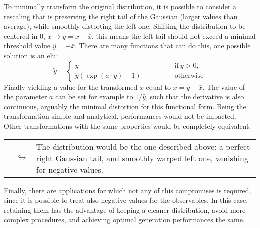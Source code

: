 \begin{description}[font=\normalfont\sffamily\scshape,leftmargin=2cm,style=nextline]
  \item[distortion] To minimally transform the original distribution, it is
    possible to consider a rescaling that is preserving the right tail of the
    Gaussian (larger values than average), while smoothly distorting the left
    one.
    Shifting the distribution to be centered in $0$, $x \to y = x - \bar{x}$,
    this means the left tail should not exceed a minimal threshold value
    $\hat{y} = -\bar{x}$.
    There are many functions that can do this, one possible solution is an
    \acrfull{elu}:
    \begin{equation}
      \tilde{y} =
      \begin{cases}
        y \qquad\qquad &\text{if}~y>0,\\
        \hat{y}\left(\exp(a \cdot y)-1\right) \qquad\qquad &\text{otherwise}
      \end{cases}
    \end{equation}
    Finally yielding a value for the transformed $x$ equal to $\tilde{x} =
    \tilde{y} + \bar{x}$.
    The value of the parameter $a$ can be set for example to $1/\hat{y}$, such
    that the derivative is also continuous, arguably the minimal distortion for
    this functional form.
    Being the transformation simple and analytical, performances would not be
    impacted.
    Other transformations with the same properties would be completely
    equivalent.

    \begin{tabularx}{\linewidth}{cX}
      $\quad\looparrowright$ & The distribution would be the one described
      above: a perfect right Gaussian tail, and smoothly warped left one,
      vanishing for negative values.
    \end{tabularx}

  \item[no bound] Finally, there are applications for which not any of this
    compromises is required, since it is possible to treat also negative values
    for the observables.
    In this case, retaining them has the advantage of keeping a cleaner
    distribution, avoid more complex procedures, and achieving optimal
    generation performances the same.
\end{description}

